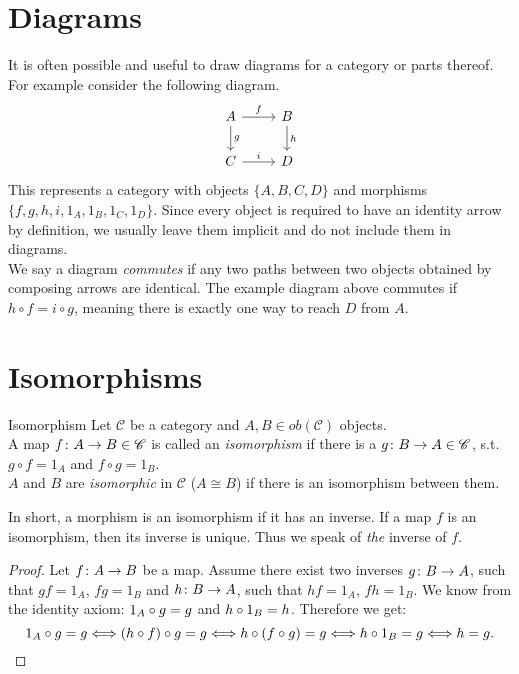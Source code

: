 \section {Diagrams}
It is often possible and useful to draw diagrams for a category or parts thereof.
For example consider the following diagram.
\[
  \begin{tikzcd}
    A \arrow{r}{f} \arrow{d}{g} & B \arrow{d}{h} \\
    C \arrow{r}{i}              & D 
  \end{tikzcd}
\]
This represents a category with objects $\{A, B, C, D\}$ and
morphisms $\{f, g, h, i, 1_A, 1_B, 1_C, 1_D \}$.
Since every object is required to have an identity arrow by definition,
we usually leave them implicit and do not include them in diagrams.\\
We say a diagram \emph{commutes} if any two paths between two objects
obtained by composing arrows are identical.
The example diagram above commutes if $ h \circ f = i \circ g $, meaning there is
exactly one way to reach $D$ from $A$.

\section {Isomorphisms}
\begin{definition}{Isomorphism}
  Let $\mathscr{C}$ be a category and $A, B \in ob(\mathscr{C})$ objects. \\
  A map $f \from A \to B \in \mathscr{C}$ is called an \emph{isomorphism} if there is a $g \from B \to A \in \mathscr{C}$,
  s.t. $g \circ f = 1_A$ and $f \circ g = 1_B$. \\
  $A$ and $B$ are \emph{isomorphic} in $\mathscr{C}$ ($A \cong B$) if there is an isomorphism between them.
\end{definition}

In short, a morphism is an isomorphism if it has an inverse.
If a map $f$ is an isomorphism, then its inverse is unique. Thus we speak of
\emph{the} inverse of $f$.

\begin{proof}
  Let $f \from A \to B$ be a map.
  Assume there exist two inverses $g \from B \to A$, such that $gf = 1_A$, $fg = 1_B$ and \mbox{$h \from B \to A$}, such that $hf = 1_A$, $fh = 1_B$.
  We know from the identity axiom: $1_A \mathbin{\circ} g = g$ and $h \mathbin{\circ} 1_B = h$. Therefore we get:
 \[  1_A \mathbin{\circ} g = g \Longleftrightarrow (h \mathbin{\circ} f) \mathbin{\circ} g = g \Longleftrightarrow h \mathbin{\circ} (f \mathbin{\circ} g) = g \Longleftrightarrow h \mathbin{\circ} 1_B = g \Longleftrightarrow h=g. \]
\end{proof}


